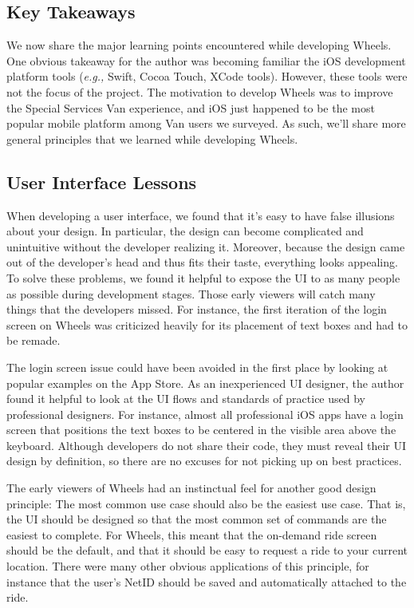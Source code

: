\documentclass[12pt, a4paper]{article}
\begin{document}
\begin{multicols*}{2}
\section{Key Takeaways}\label{sec:takeaways}
We now share the major learning points encountered while developing Wheels. One obvious takeaway for the author was becoming familiar the iOS development platform tools (\textit{e.g.,} Swift, Cocoa Touch, XCode tools). However, these tools were not the focus of the project. The motivation to develop Wheels was to improve the Special Services Van experience, and iOS just happened to be the most popular mobile platform among Van users we surveyed. As such, we'll share more general principles that we learned while developing Wheels.

\subsection{User Interface Lessons}
When developing a user interface, we found that it's easy to have false illusions about your design. In particular, the design can become complicated and unintuitive without the developer realizing it. Moreover, because the design came out of the developer's head and thus fits their taste, everything looks appealing. To solve these problems, we found it helpful to expose the UI to as many people as possible during development stages. Those early viewers will catch many things that the developers missed. For instance, the first iteration of the login screen on Wheels was criticized heavily for its placement of text boxes and had to be remade.

The login screen issue could have been avoided in the first place by looking at popular examples on the App Store. As an inexperienced UI designer, the author found it helpful to look at the UI flows and standards of practice used by professional designers. For instance, almost all professional iOS apps have a login screen that positions the text boxes to be centered in the visible area above the keyboard. Although developers do not share their code, they must reveal their UI design by definition, so there are no excuses for not picking up on best practices.

The early viewers of Wheels had an instinctual feel for another good design principle: The most common use case should also be the easiest use case. That is, the UI should be designed so that the most common set of commands are the easiest to complete. For Wheels, this meant that the on-demand ride screen should be the default, and that it should be easy to request a ride to your current location. There were many other obvious applications of this principle, for instance that the user's NetID should be saved and automatically attached to the ride.


\end{multicols*}
\end{document}
